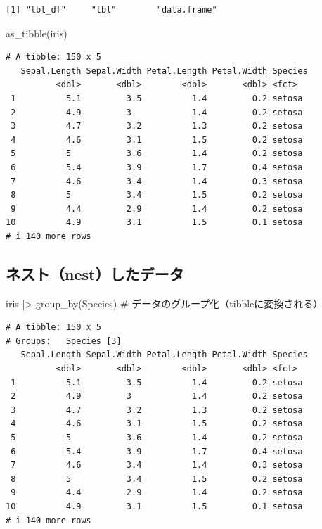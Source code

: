 \documentclass[
  letterpaper,
  DIV=11,
  numbers=noendperiod]{scrreprt}
\newenvironment{Shaded}{\begin{snugshade}}{\end{snugshade}}
\newcommand{\CommentTok}[1]{\textcolor[rgb]{0.37,0.37,0.37}{#1}}
\newcommand{\FunctionTok}[1]{\textcolor[rgb]{0.28,0.35,0.67}{#1}}
\newcommand{\NormalTok}[1]{\textcolor[rgb]{0.00,0.23,0.31}{#1}}
\newcommand{\SpecialCharTok}[1]{\textcolor[rgb]{0.37,0.37,0.37}{#1}}
\begin{document}
\begin{verbatim}
[1] "tbl_df"     "tbl"        "data.frame"
\end{verbatim}

\begin{Shaded}
\begin{Highlighting}[]
\FunctionTok{as\_tibble}\NormalTok{(iris)}
\end{Highlighting}
\end{Shaded}

\begin{verbatim}
# A tibble: 150 x 5
   Sepal.Length Sepal.Width Petal.Length Petal.Width Species
          <dbl>       <dbl>        <dbl>       <dbl> <fct>  
 1          5.1         3.5          1.4         0.2 setosa 
 2          4.9         3            1.4         0.2 setosa 
 3          4.7         3.2          1.3         0.2 setosa 
 4          4.6         3.1          1.5         0.2 setosa 
 5          5           3.6          1.4         0.2 setosa 
 6          5.4         3.9          1.7         0.4 setosa 
 7          4.6         3.4          1.4         0.3 setosa 
 8          5           3.4          1.5         0.2 setosa 
 9          4.4         2.9          1.4         0.2 setosa 
10          4.9         3.1          1.5         0.1 setosa 
# i 140 more rows
\end{verbatim}

\hypertarget{ux30cdux30b9ux30c8nestux3057ux305fux30c7ux30fcux30bf}{%
\subsection{ネスト（nest）したデータ}\label{ux30cdux30b9ux30c8nestux3057ux305fux30c7ux30fcux30bf}}

\begin{Shaded}
\begin{Highlighting}[]
\NormalTok{iris }\SpecialCharTok{|\textgreater{}} \FunctionTok{group\_by}\NormalTok{(Species) }\CommentTok{\# データのグループ化（tibbleに変換される）}
\end{Highlighting}
\end{Shaded}

\begin{verbatim}
# A tibble: 150 x 5
# Groups:   Species [3]
   Sepal.Length Sepal.Width Petal.Length Petal.Width Species
          <dbl>       <dbl>        <dbl>       <dbl> <fct>  
 1          5.1         3.5          1.4         0.2 setosa 
 2          4.9         3            1.4         0.2 setosa 
 3          4.7         3.2          1.3         0.2 setosa 
 4          4.6         3.1          1.5         0.2 setosa 
 5          5           3.6          1.4         0.2 setosa 
 6          5.4         3.9          1.7         0.4 setosa 
 7          4.6         3.4          1.4         0.3 setosa 
 8          5           3.4          1.5         0.2 setosa 
 9          4.4         2.9          1.4         0.2 setosa 
10          4.9         3.1          1.5         0.1 setosa 
# i 140 more rows
\end{verbatim}
\end{document}
